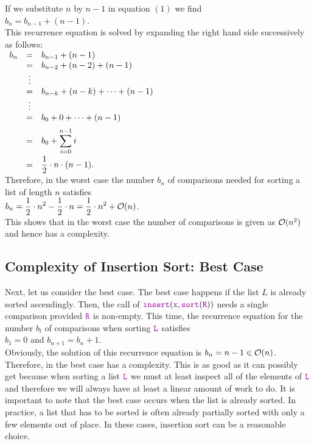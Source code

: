 If we substitute $n$ by $n-1$ in equation $(1)$ we find
\\[0.2cm]
\hspace*{1.3cm}
$b_n = b_{n-1} + (n - 1)$.
\\[0.2cm]
This recurrence equation is solved by expanding the right hand side successively as follows:
\\[0.2cm]
\hspace*{1.3cm}
$
\begin{array}[t]{lcl}
  b_{n} & = & b_{n-1} + (n - 1)                     \\ 
        & = & b_{n-2} + (n - 2) + (n - 1)           \\ 
        & \vdots &                                  \\
        & = & b_{n-k} + (n - k) + \cdots + (n - 1)  \\ 
        & \vdots &                                  \\
        & = & b_{0} + 0 + \cdots + (n - 1)      \\[0.2cm] 
        & = & \displaystyle b_{0} + \sum\limits_{i = 0}^{n - 1} i \\[0.4cm]
        & = & \displaystyle \frac{1}{2} \cdot n \cdot (n - 1).
\end{array}
$
\\[0.2cm]
Therefore, in the worst case the number $b_n$ of comparisons needed for sorting a list of length $n$ satisfies 
\\[0.2cm]
\hspace*{1.3cm}
$\displaystyle b_n = \frac{1}{2} \cdot n^2 - \frac{1}{2} \cdot n = \frac{1}{2} \cdot n^2 + \mathcal{O}(n)$.
\\[0.2cm]
This shows that in the worst case the number of comparisons is given as $\mathcal{O}(n^2)$ and hence
 has a  complexity.

\subsection{Complexity of Insertion Sort: Best Case}
Next, let us consider the best case.  The best case happens if the list $L$ is already sorted
ascendingly.  Then, the call of 
$\mytt{insert}(\mytt{x},\mytt{sort}(\mytt{R}))$ needs a single comparison provided $\mytt{R}$ is non-empty.  This time, the recurrence
equation for the number $b_l$ of comparisons when sorting $\mytt{L}$ satisfies
 \\[0.2cm]
\hspace*{1.3cm}
$b_1 = 0$ \quad and \quad $b_{n+1} = b_n + 1$. 
\\[0.2cm]
Obviously, the solution of this recurrence equation is $b_n = n-1 \in \mathcal{O}(n)$.  Therefore, in the best case
 has a  complexity.  This is as good as it can possibly get because when
sorting a list $\mytt{L}$ we must at least inspect all of the elements of $\mytt{L}$ and therefore we will
always have at least a linear amount of work to do.  It is important to note that the best case occurs when the
list is already sorted.  In practice, a list that has to be sorted is often already partially sorted with only
a few elements out of place.  In these cases, insertion sort can be a reasonable choice.


